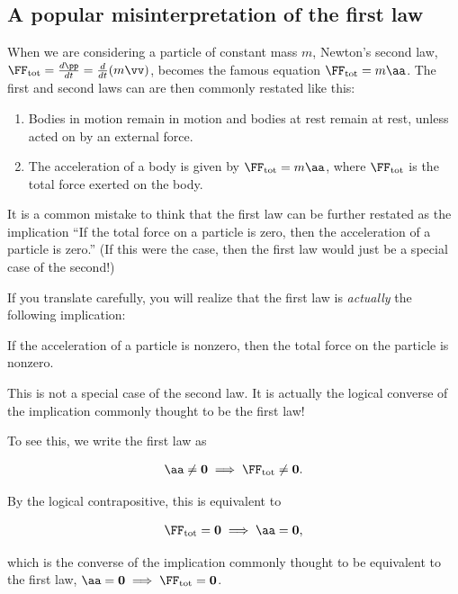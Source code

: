 \documentclass{article}
\begin{document}
\subsection*{A popular misinterpretation of the first law}

When we are considering a particle of constant mass $m$, Newton's second law, $\FF_{\text{tot}} = \frac{d\pp}{dt} = \frac{d}{dt}(m\vv)$, becomes the famous equation $\FF_{\text{tot}} = m\aa$. The first and second laws can are then commonly restated like this:

\begin{enumerate}
	\item Bodies in motion remain in motion and bodies at rest remain at rest, unless acted on by an external force.
	\item The acceleration of a body is given by $\FF_{\text{tot}} = m\aa$, where $\FF_{\text{tot}}$ is the total force exerted on the body.
\end{enumerate}

It is a common mistake to think that the first law can be further restated as the implication ``If the total force on a particle is zero, then the acceleration of a particle is zero.'' (If this were the case, then the first law would just be a special case of the second!)

If you translate carefully, you will realize that the first law is \textit{actually} the following implication:

\begin{center}
	If the acceleration of a particle is nonzero, then the total force on the particle is nonzero.
\end{center}

This is not a special case of the second law. It is actually the logical converse of the implication commonly thought to be the first law!

To see this, we write the first law as

\begin{align*}
	\aa \neq \mathbf{0} \implies \FF_{\text{tot}} \neq \mathbf{0}.
\end{align*}

By the logical contrapositive, this is equivalent to

\begin{align*}
	\FF_{\text{tot}} = \mathbf{0} \implies \aa = \mathbf{0},
\end{align*}

which is the converse of the implication commonly thought to be equivalent to the first law, $\aa = \mathbf{0} \implies \FF_{\text{tot}} = \mathbf{0}$.
\end{document}
